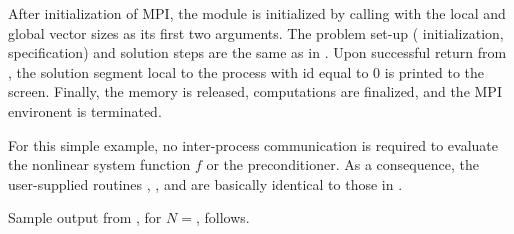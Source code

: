After initialization of MPI, the {\nvecp} module is initialized by calling
 with the local and global vector sizes as its first two
arguments.
The problem set-up ({\kinsol} initialization, {\kinspgmr} specification) and
solution steps are the same as in . 
Upon successful return from , the solution segment local to 
the process with id equal to $0$ is printed to the screen.
Finally, the {\kinsol} memory is released, {\nvecp} computations are 
finalized, and the MPI environent is terminated. 

For this simple example, no inter-process communication is required to
evaluate the nonlinear system function $f$ or the preconditioner. 
As a consequence, the user-supplied routines , , and
 are basically identical to those in .

Sample output from , for $N=$, follows.

\vspace{0.1in}

